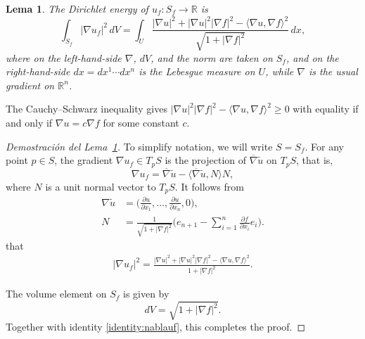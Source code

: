 \documentclass{GEM-JNL-FMP}
\newtheorem{lemma}[theorem]{Lema}
\theoremstyle{definition}
\numberwithin{equation}{section}
\begin{document}
\begin{lemma}\label{lemma:dirichletgraph}
	The Dirichlet energy of $u_f\colon S_f\rightarrow\mathbb{R}$ is
	\begin{equation}\label{eq:dirichletgraph}
	\int_{S_f} |\nabla u_f|^2\,dV
	= \int_U \frac{|\nabla u|^2 + |\nabla u|^2 |\nabla f|^2
	-\langle {\nabla u}, {\nabla f} \rangle^2}{\sqrt{1 + |\nabla f|^2}}
	\,dx,
	\end{equation}
	where on the left-hand-side $\nabla$, $dV$, and the norm are taken on $S_f$, and on the right-hand-side $dx=dx^1\cdots dx^n$ is the Lebesgue measure on $U$, while $\nabla$ is the usual gradient on $\mathbb{R}^n$.
\end{lemma}

	The Cauchy--Schwarz inequality gives $|\nabla u|^2 |\nabla f|^2
- \langle {\nabla u}, {\nabla f} \rangle^2 \geq 0$ with equality if and only
if $\nabla u = c \nabla f$ for some constant $c$.

\begin{proof}[Demostración del Lema~\ref{lemma:dirichletgraph}]
	To simplify notation, we will write $S=S_f$.
	For any point $p\in S$, the gradient $\nabla u_f\in T_pS$ is the projection of $\overline{\nabla}\widetilde{u}$ on $T_pS$,
	that is,
	\begin{equation*}
	\nabla u_f = \overline{\nabla} \widetilde{u} -
\langle {\overline{\nabla} \widetilde{u}}, {N} \rangle N,
	\end{equation*}
	where $N$ is a unit normal vector to $T_pS$.
	It follows from
	\begin{align*}
	\nabla\widetilde{u} &= \Big(\frac{\partial u}{\partial x_1}, \dots, \frac{\partial u}
	{\partial x_n}, 0\Big),
	\\%
	N &=\frac{1}{\sqrt{1 + |\nabla f|^2}}\Big(e_{n+1}-\sum_{i=1}^n\frac{\partial f}{\partial x_i}e_i\Big).
	\end{align*}
	that
	\begin{gather}\label{identity:nablauf}
	|\nabla u_f|^2
	= \frac{|\nabla u|^2 + |\nabla u|^2|\nabla f|^2
		- \langle {\nabla u}, {\nabla f} \rangle^2}{1 + |\nabla f|^2}.
	\end{gather}
	
	The volume element on $S_f$ is given by
	\begin{equation}
	dV %
	= \sqrt{1 + |\nabla f|^2}.
	\end{equation}
	Together with identity \eqref{identity:nablauf}, this completes the proof.
\end{proof}
\end{document}
